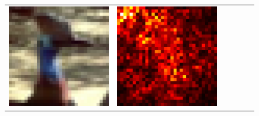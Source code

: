 \documentclass[preprint,12pt]{elsarticle}
\begin{document}
\begin{figure}[p]
\begin{tabular}{cccccc}
  \includegraphics[scale=\scale]{../visualizations/examples/cifar10/resnet18/images/2.png} &
  \includegraphics[scale=\scale]{../visualizations/examples/cifar10/resnet18/saliency_map/2.png} & 

\end{tabular}
\end{figure}
\end{document}
